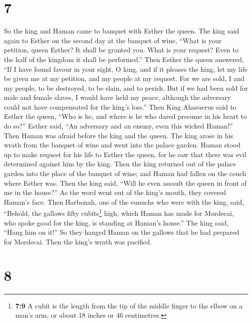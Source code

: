 \hypertarget{section-6}{%
\section{7}\label{section-6}}

 So the king and Haman came to banquet with Esther the
queen.  The king said again to Esther on the second day at
the banquet of wine, ``What is your petition, queen Esther? It shall be
granted you. What is your request? Even to the half of the kingdom it
shall be performed.''  Then Esther the queen answered,
``If I have found favour in your sight, O king, and if it pleases the
king, let my life be given me at my petition, and my people at my
request.  For we are sold, I and my people, to be
destroyed, to be slain, and to perish. But if we had been sold for male
and female slaves, I would have held my peace, although the adversary
could not have compensated for the king's loss.''  Then
King Ahasuerus said to Esther the queen, ``Who is he, and where is he
who dared presume in his heart to do so?''  Esther said,
``An adversary and an enemy, even this wicked Haman!'' Then Haman was
afraid before the king and the queen.  The king arose in
his wrath from the banquet of wine and went into the palace garden.
Haman stood up to make request for his life to Esther the queen, for he
saw that there was evil determined against him by the king.
 Then the king returned out of the palace garden into the
place of the banquet of wine; and Haman had fallen on the couch where
Esther was. Then the king said, ``Will he even assault the queen in
front of me in the house?'' As the word went out of the king's mouth,
they covered Haman's face.  Then Harbonah, one of the
eunuchs who were with the king, said, ``Behold, the gallows fifty
cubits\footnote{\textbf{7:9} A cubit is the length from the tip of the
  middle finger to the elbow on a man's arm, or about 18 inches or 46
  centimetres.} high, which Haman has made for Mordecai, who spoke good
for the king, is standing at Haman's house.'' The king said, ``Hang him
on it!''  So they hanged Haman on the gallows that he had
prepared for Mordecai. Then the king's wrath was pacified.

\hypertarget{section-7}{%
\section{8}\label{section-7}}

